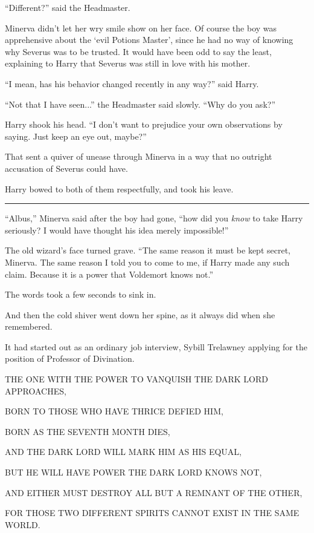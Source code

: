 ``Different?'' said the Headmaster.

Minerva didn't let her wry smile show on her face. Of course the boy was apprehensive about the `evil Potions Master', since he had no way of knowing why Severus was to be trusted. It would have been odd to say the least, explaining to Harry that Severus was still in love with his mother.

``I mean, has his behavior changed recently in any way?'' said Harry.

``Not that I have seen...'' the Headmaster said slowly. ``Why do you ask?''

Harry shook his head. ``I don't want to prejudice your own observations by saying. Just keep an eye out, maybe?''

That sent a quiver of unease through Minerva in a way that no outright accusation of Severus could have.

Harry bowed to both of them respectfully, and took his leave.

\begin{center}\rule{3in}{0.4pt}\end{center}

``Albus,'' Minerva said after the boy had gone, ``how did you \emph{know} to take Harry seriously? I would have thought his idea merely impossible!''

The old wizard's face turned grave. ``The same reason it must be kept secret, Minerva. The same reason I told you to come to me, if Harry made any such claim. Because it is a power that Voldemort knows not.''

The words took a few seconds to sink in.

And then the cold shiver went down her spine, as it always did when she remembered.

It had started out as an ordinary job interview, Sybill Trelawney applying for the position of Professor of Divination.

THE ONE WITH THE POWER TO VANQUISH THE DARK LORD APPROACHES,

BORN TO THOSE WHO HAVE THRICE DEFIED HIM,

BORN AS THE SEVENTH MONTH DIES,

AND THE DARK LORD WILL MARK HIM AS HIS EQUAL,

BUT HE WILL HAVE POWER THE DARK LORD KNOWS NOT,

AND EITHER MUST DESTROY ALL BUT A REMNANT OF THE OTHER,

FOR THOSE TWO DIFFERENT SPIRITS CANNOT EXIST IN THE SAME WORLD.

